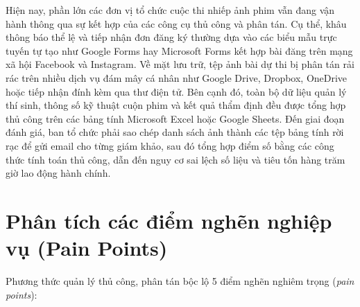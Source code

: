 Hiện nay, phần lớn các đơn vị tổ chức cuộc thi nhiếp ảnh phim vẫn đang vận hành thông qua sự kết hợp của các công cụ thủ công và phân tán. Cụ thể, khâu thông báo thể lệ và tiếp nhận đơn đăng ký thường dựa vào các biểu mẫu trực tuyến tự tạo như Google Forms hay Microsoft Forms kết hợp bài đăng trên mạng xã hội Facebook và Instagram. Về mặt lưu trữ, tệp ảnh bài dự thi bị phân tán rải rác trên nhiều dịch vụ đám mây cá nhân như Google Drive, Dropbox, OneDrive hoặc tiếp nhận đính kèm qua thư điện tử. Bên cạnh đó, toàn bộ dữ liệu quản lý thí sinh, thông số kỹ thuật cuộn phim và kết quả thẩm định đều được tổng hợp thủ công trên các bảng tính Microsoft Excel hoặc Google Sheets. Đến giai đoạn đánh giá, ban tổ chức phải sao chép danh sách ảnh thành các tệp bảng tính rời rạc để gửi email cho từng giám khảo, sau đó tổng hợp điểm số bằng các công thức tính toán thủ công, dẫn đến nguy cơ sai lệch số liệu và tiêu tốn hàng trăm giờ lao động hành chính.

\section{Phân tích các điểm nghẽn nghiệp vụ (Pain Points)}
\label{s:c1_painpoints}

Phương thức quản lý thủ công, phân tán bộc lộ 5 điểm nghẽn nghiêm trọng (\textit{pain points}):

